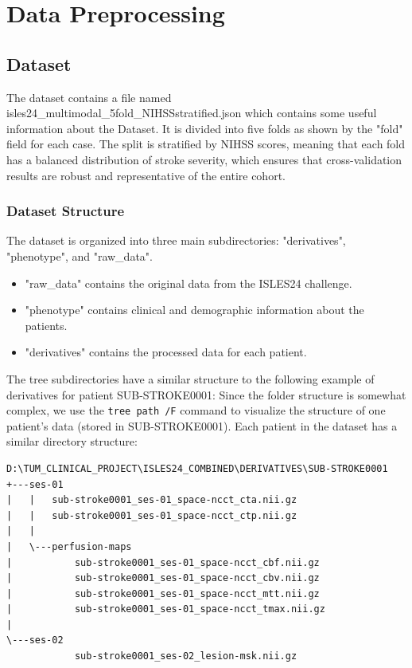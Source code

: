 \chapter{Data Preprocessing}
\label{ch:data_preprocessing}

\section{Dataset}
\label{sec:dataset}

The dataset contains a file named isles24\_multimodal\_5fold\_NIHSSstratified.json which contains some useful information about the Dataset. It is divided into five folds as shown by the "fold" field for each case. The split is stratified by NIHSS scores, meaning that each fold has a balanced distribution of stroke severity, which ensures that cross-validation results are robust and representative of the entire cohort.

\subsection{Dataset Structure}
\label{subsec:dataset_structure}

The dataset is organized into three main subdirectories: "derivatives", "phenotype", and "raw\_data". 
\begin{itemize}
    \item "raw\_data" contains the original data from the ISLES24 challenge.
    \item "phenotype" contains clinical and demographic information about the patients.
    \item "derivatives" contains the processed data for each patient.
\end{itemize}

The tree subdirectories have a similar structure to the following example of derivatives for patient SUB-STROKE0001:
Since the folder structure is somewhat complex, we use the \texttt{tree path /F} command to visualize the structure of one patient's data (stored in SUB-STROKE0001). Each patient in the dataset has a similar directory structure:
\begin{verbatim}
D:\TUM_CLINICAL_PROJECT\ISLES24_COMBINED\DERIVATIVES\SUB-STROKE0001
+---ses-01
|   |   sub-stroke0001_ses-01_space-ncct_cta.nii.gz
|   |   sub-stroke0001_ses-01_space-ncct_ctp.nii.gz
|   |
|   \---perfusion-maps
|           sub-stroke0001_ses-01_space-ncct_cbf.nii.gz
|           sub-stroke0001_ses-01_space-ncct_cbv.nii.gz
|           sub-stroke0001_ses-01_space-ncct_mtt.nii.gz
|           sub-stroke0001_ses-01_space-ncct_tmax.nii.gz
|
\---ses-02
            sub-stroke0001_ses-02_lesion-msk.nii.gz
\end{verbatim}

